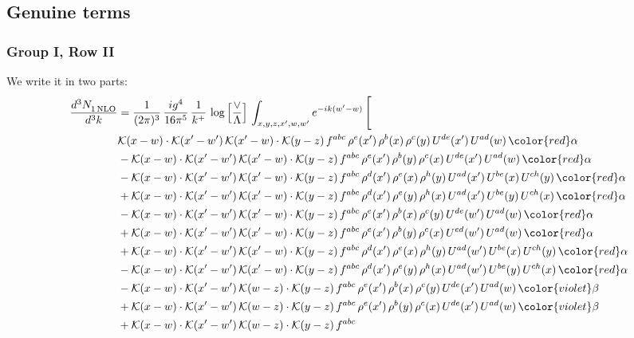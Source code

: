\subsection{Genuine terms}
\subsubsection{Group I, Row II}
We write it in two parts:
\begin{align}
    \frac{d^{3}N_{1\,\rm NLO}^{\rm}}{d^{3}k}  & = \frac{1}{(2\pi)^{3}}\, \frac{ig^{4}}{16\pi^{5}}\, \frac{1}{k^{+}}\, \log{\left[\frac{\vee}{\Lambda}\right]}\, \int_{x,y,z,x^{\prime},w,w^{\prime}}e^{-ik(w^{\prime}-w)}\, \Bigg[\notag \\ & \mathcal{K}(x-w)\cdot \mathcal{K}(x'-w')\, \mathcal{K}(x'-w)\cdot \mathcal{K}(y-z)\, f^{abc}\, \rho^{e}(x')\,\rho^{b}(x)\,\rho^{c}(y)\,U^{de}(x')\,U^{ad}(w)\,{\color{red}\alpha} \notag \\ & -\mathcal{K}(x-w)\cdot \mathcal{K}(x'-w')\, \mathcal{K}(x'-w)\cdot \mathcal{K}(y-z)\, f^{abc}\, \rho^{e}(x')\,\rho^{b}(y)\,\rho^{c}(x)\,U^{de}(x')\,U^{ad}(w)\,{\color{red}\alpha} \notag \\ & -\mathcal{K}(x-w)\cdot \mathcal{K}(x'-w')\, \mathcal{K}(x'-w)\cdot \mathcal{K}(y-z)\, f^{abc}\, \rho^{d}(x')\,\rho^{e}(x)\,\rho^{h}(y)\,U^{ad}(x')\,U^{be}(x)\,U^{ch}(y)\,{\color{red}\alpha} \notag \\ & + \mathcal{K}(x-w)\cdot \mathcal{K}(x'-w')\, \mathcal{K}(x'-w)\cdot \mathcal{K}(y-z)\, f^{abc}\, \rho^{d}(x')\,\rho^{e}(y)\,\rho^{h}(x)\,U^{ad}(x')\,U^{be}(y)\,U^{ch}(x)\,{\color{red}\alpha} \notag \\ & -\mathcal{K}(x-w)\cdot \mathcal{K}(x'-w')\, \mathcal{K}(x'-w)\cdot \mathcal{K}(y-z)\, f^{abc}\, \rho^{e}(x')\,\rho^{b}(x)\,\rho^{c}(y)\,U^{de}(w')\,U^{ad}(w)\,{\color{red}\alpha} \notag \\ & +\mathcal{K}(x-w)\cdot \mathcal{K}(x'-w')\, \mathcal{K}(x'-w)\cdot \mathcal{K}(y-z)\, f^{abc}\, \rho^{e}(x')\,\rho^{b}(y)\,\rho^{c}(x)\,U^{ed}(w')\,U^{ad}(w)\,{\color{red}\alpha} \notag \\ & +\mathcal{K}(x-w)\cdot \mathcal{K}(x'-w')\, \mathcal{K}(x'-w)\cdot \mathcal{K}(y-z)\, f^{abc}\, \rho^{d}(x')\,\rho^{e}(x)\,\rho^{h}(y)\,U^{ad}(w')\,U^{be}(x)\,U^{ch}(y)\,{\color{red}\alpha} \notag \\ & -\mathcal{K}(x-w)\cdot \mathcal{K}(x'-w')\, \mathcal{K}(x'-w)\cdot \mathcal{K}(y-z)\, f^{abc}\, \rho^{d}(x')\,\rho^{e}(y)\,\rho^{h}(x)\,U^{ad}(w')\,U^{be}(y)\,U^{ch}(x)\,{\color{red}\alpha} \notag \\ & - \mathcal{K}(x-w) \cdot \mathcal{K}(x'-w')\, \mathcal{K}(w-z)\cdot \mathcal{K}(y-z)\, f^{abc}\, \rho^{e}(x')\,\rho^{b}(x)\,\rho^{c}(y)\,U^{de}(x')\,U^{ad}(w)\,{\color{violet} \beta} \notag \\ &  +  \mathcal{K}(x-w) \cdot \mathcal{K}(x'-w')\, \mathcal{K}(w-z)\cdot \mathcal{K}(y-z)\, f^{abc}\, \rho^{e}(x')\,\rho^{b}(y)\,\rho^{c}(x)\,U^{de}(x')\,U^{ad}(w)\,{\color{violet} \beta} \notag \\ & + \mathcal{K}(x-w) \cdot \mathcal{K}(x'-w')\, \mathcal{K}(w-z)\cdot \mathcal{K}(y-z)\, f^{abc}\, 
\end{align}
